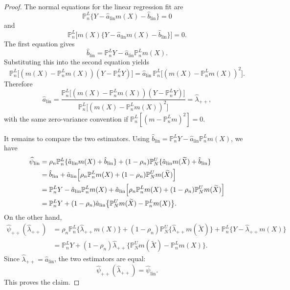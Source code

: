 \documentclass{article}
\theoremstyle{plain}
\theoremstyle{definition}
\newcommand{\1}{\mathbbm{1}}
\newcommand{\Pl}{\mathbb{P}^{L}_n}
\newcommand{\Pu}{\mathbb{P}^{U}_N}
\begin{document}
\begin{proof}
The normal equations for the linear regression fit are
\[
\Pl\{Y-\hat a_{\mathrm{lin}}m(X)-\hat b_{\mathrm{lin}}\}=0
\]
and
\[
\Pl\bigl[m(X)\{Y-\hat a_{\mathrm{lin}}m(X)-\hat b_{\mathrm{lin}}\}\bigr]=0.
\]
The first equation gives
\[
\hat b_{\mathrm{lin}}=\Pl Y-\hat a_{\mathrm{lin}}\Pl m(X).
\]
Substituting this into the second equation yields
\[
\Pl\bigl[(m(X)-\Pl m(X))(Y-\Pl Y)\bigr]
=
\hat a_{\mathrm{lin}}\,
\Pl\bigl[(m(X)-\Pl m(X))^2\bigr].
\]
Therefore
\[
\hat a_{\mathrm{lin}}
=
\frac{\Pl\!\bigl[(m(X)-\Pl m(X))(Y-\Pl Y)\bigr]}
{\Pl\!\bigl[(m(X)-\Pl m(X))^2\bigr]}
=
\hat\lambda_{++},
\]
with the same zero-variance convention if \(\Pl[(m-\Pl m)^2]=0\).

It remains to compare the two estimators. Using
\(\hat b_{\mathrm{lin}}=\Pl Y-\hat a_{\mathrm{lin}}\Pl m(X)\),
we have
\begin{align*}
\widehat\psi_{\mathrm{lin}}
&=
\rho_n \Pl\{\hat a_{\mathrm{lin}}m(X)+\hat b_{\mathrm{lin}}\}
+
(1-\rho_n)\Pu\{\hat a_{\mathrm{lin}}m(\widetilde X)+\hat b_{\mathrm{lin}}\}\\
&=
\hat b_{\mathrm{lin}}
+
\hat a_{\mathrm{lin}}
\Bigl[
\rho_n \Pl m(X)+(1-\rho_n)\Pu m(\widetilde X)
\Bigr]\\
&=
\Pl Y-\hat a_{\mathrm{lin}}\Pl m(X)
+
\hat a_{\mathrm{lin}}
\Bigl[
\rho_n \Pl m(X)+(1-\rho_n)\Pu m(\widetilde X)
\Bigr]\\
&=
\Pl Y
+
(1-\rho_n)\hat a_{\mathrm{lin}}
\bigl\{\Pu m(\widetilde X)-\Pl m(X)\bigr\}.
\end{align*}
On the other hand,
\begin{align*}
\widehat\psi_{++}(\hat\lambda_{++})
&=
\rho_n \Pl\{\hat\lambda_{++} m(X)\}
+
(1-\rho_n)\Pu\{\hat\lambda_{++} m(\widetilde X)\}
+
\Pl\{Y-\hat\lambda_{++} m(X)\}\\
&=
\Pl Y
+
(1-\rho_n)\hat\lambda_{++}
\bigl\{\Pu m(\widetilde X)-\Pl m(X)\bigr\}.
\end{align*}
Since \(\hat\lambda_{++}=\hat a_{\mathrm{lin}}\), the two estimators are equal:
\[
\widehat\psi_{++}(\hat\lambda_{++})=\widehat\psi_{\mathrm{lin}}.
\]
This proves the claim.
\end{proof}
\end{document}
